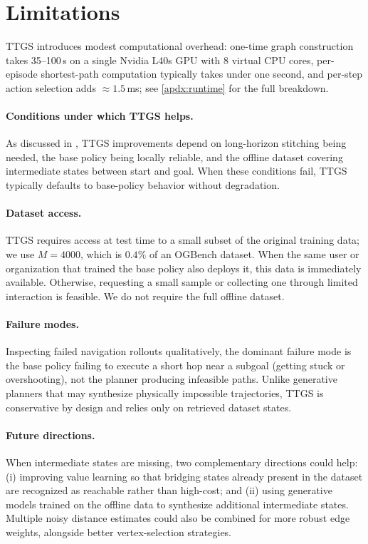 \documentclass{article} %
\begin{document}
\section{Limitations}
TTGS introduces modest computational overhead: one-time graph construction takes 35--100\,s on a single Nvidia L40s GPU with 8 virtual CPU cores, per-episode shortest-path computation typically takes under one second, and per-step action selection adds $\approx 1.5$\,ms; see \autoref{apdx:runtime} for the full breakdown.

\paragraph{Conditions under which TTGS helps.} As discussed in , TTGS improvements depend on long-horizon stitching being needed, the base policy being locally reliable, and the offline dataset covering intermediate states between start and goal. When these conditions fail, TTGS typically defaults to base-policy behavior without degradation.

\paragraph{Dataset access.} TTGS requires access at test time to a small subset of the original training data; we use $M{=}4000$, which is $0.4\%$ of an OGBench dataset. When the same user or organization that trained the base policy also deploys it, this data is immediately available. Otherwise, requesting a small sample or collecting one through limited interaction is feasible. We do not require the full offline dataset.

\paragraph{Failure modes.} Inspecting failed navigation rollouts qualitatively, the dominant failure mode is the base policy failing to execute a short hop near a subgoal (getting stuck or overshooting), not the planner producing infeasible paths. Unlike generative planners that may synthesize physically impossible trajectories, TTGS is conservative by design and relies only on retrieved dataset states.

\paragraph{Future directions.} When intermediate states are missing, two complementary directions could help: (i) improving value learning so that bridging states already present in the dataset are recognized as reachable rather than high-cost; and (ii) using generative models trained on the offline data to synthesize additional intermediate states. Multiple noisy distance estimates could also be combined for more robust edge weights, alongside better vertex-selection strategies.
\end{document}
